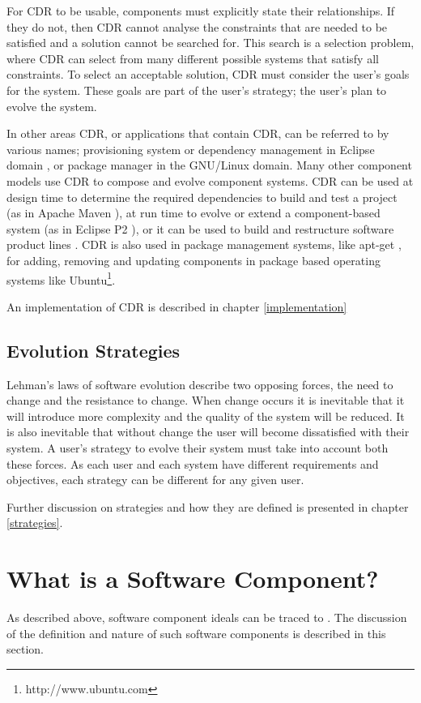 For CDR to be usable, components must explicitly state their relationships.
If they do not, then CDR cannot analyse the constraints that are needed to be satisfied and a solution cannot be searched for.
This search is a selection problem, where CDR can select from many different possible systems that satisfy all constraints.
To select an acceptable solution, CDR must consider the user's goals for the system.
These goals are part of the user's strategy; the user's plan to evolve the system.

In other areas CDR, or applications that contain CDR, can be referred to by various names; provisioning system or dependency management in Eclipse domain \citep{leBerre2010},
or package manager in the GNU/Linux \citep{Barth2005} domain.
Many other component models use CDR to compose and evolve component systems.
CDR can be used at design time to determine the required dependencies to build and test a project (as in Apache Maven \citep{casey_better_2008}),
at run time to evolve or extend a component-based system (as in Eclipse P2 \citep{leBerre2010}),
or it can be used to build and restructure software product lines \citep{savolainen_analyzing_2007}.
CDR is also used in package management systems, like apt-get \citep{Barth2005},
for adding, removing and updating components in package based operating systems like Ubuntu\footnote{http://www.ubuntu.com}. 

An implementation of CDR is described in chapter \ref{implementation}

\subsection{Evolution Strategies}
Lehman's laws of software evolution \citep{lehman1980,lehman1997} describe two opposing forces,
the need to change and the resistance to change.
When change occurs it is inevitable that it will introduce more complexity and the quality of the system will be reduced.
It is also inevitable that without change the user will become dissatisfied with their system.
A user's strategy to evolve their system must take into account both these forces.
As each user and each system have different requirements and objectives, each strategy can be different for any given user.

Further discussion on strategies and how they are defined is presented in chapter \ref{strategies}.

\section{What is a Software Component?}
\label{background.components}
As described above, software component ideals can be traced to \citep{McIlroy1969}.
The discussion of the definition and nature of such software components is described in this section.

